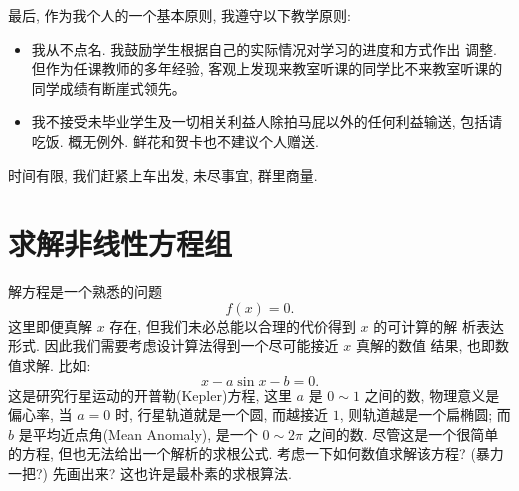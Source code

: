\documentclass[a4paper]{ctexart}
\newcommand{\remark}[1]
{\noindent {\bf Remark {#1}}}
\begin{document}
最后, 作为我个人的一个基本原则, 我遵守以下教学原则:

\begin{itemize}
  \item 我从不点名. 我鼓励学生根据自己的实际情况对学习的进度和方式作出
    调整. 但作为任课教师的多年经验, 客观上发现来教室听课的同学比不来教室听课的同学成绩有断崖式领先。
  \item 我不接受未毕业学生及一切相关利益人除拍马屁以外的任何利益输送,
    包括请吃饭. 概无例外. 鲜花和贺卡也不建议个人赠送.  
\end{itemize}

时间有限, 我们赶紧上车出发, 未尽事宜, 群里商量.


\section{求解非线性方程组}
\label{sec::sne}

\remark{1.1} 解方程是一个熟悉的问题
\begin{equation}
  f(x) = 0.
  \label{eq::ge}
\end{equation}
这里即便真解 $x$ 存在, 但我们未必总能以合理的代价得到 $x$ 的可计算的解
析表达形式. 因此我们需要考虑设计算法得到一个尽可能接近 $x$ 真解的数值
结果, 也即数值求解. 比如:
\begin{equation}
  x - a \sin x - b = 0.
  \label{eq::Kepler}
\end{equation}
这是研究行星运动的开普勒(Kepler)方程, 这里 $a$ 是 $0 \sim 1$ 之间的数, 物理意义是偏心率, 
当 $a = 0$ 时, 行星轨道就是一个圆, 而越接近 $1$, 则轨道越是一个扁椭圆; 而 $b$ 是平均近点角(Mean Anomaly), 
是一个 $0 \sim 2 \pi$ 之间的数. 尽管这是一个很简单的方程, 但也无法给出一个解析的求根公式. 
考虑一下如何数值求解该方程? (暴力一把?) 先画出来? 这也许是最朴素的求根算法.
\end{document}
